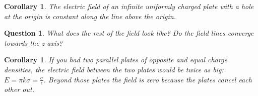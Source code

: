 \documentclass[12pt]{article}
\theoremstyle{plain}
\newtheorem{corollary}[theorem]{Corollary}
\newtheorem{question}[theorem]{Question}
\theoremstyle{definition}
\theoremstyle{remark}
\begin{document}
\begin{corollary}
The electric field of an infinite uniformly charged plate with a hole at the origin is constant along the line above the origin.
\end{corollary}

\begin{question}
What does the rest of the field look like? Do the field lines converge towards the z-axis?
\end{question}

\begin{corollary}
If you had two parallel plates of opposite and equal charge densities, the electric field between the two plates would be twice as big: $E = \pi k \sigma = \frac{\sigma}{\epsilon}$. Beyond those plates the field is zero because the plates cancel each other out.
\end{corollary}
\end{document}
